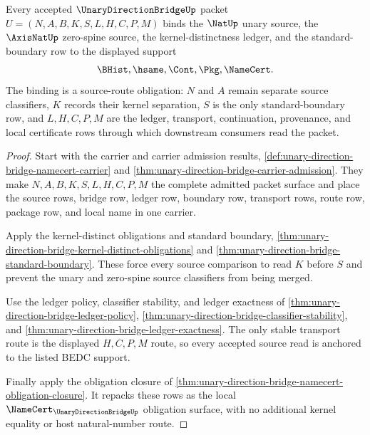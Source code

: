 \begin{theorem}
\label{thm:unary-direction-bridge-scope-source-anchors}
Every accepted $\UnaryDirectionBridgeUp$ packet $U=(N,A,B,K,S,L,H,C,P,M)$ binds the $\NatUp$ unary source, the $\AxisNatUp$ zero-spine source, the kernel-distinctness ledger, and the standard-boundary row to the displayed support
$$
\BHist,\hsame,\Cont,\Pkg,\NameCert.
$$
The binding is a source-route obligation: $N$ and $A$ remain separate source classifiers, $K$ records their kernel separation, $S$ is the only standard-boundary row, and $L,H,C,P,M$ are the ledger, transport, continuation, provenance, and local certificate rows through which downstream consumers read the packet.
\end{theorem}
\begin{proof}
Start with the carrier and carrier admission results, \autoref{def:unary-direction-bridge-namecert-carrier} and \autoref{thm:unary-direction-bridge-carrier-admission}. They make $N,A,B,K,S,L,H,C,P,M$ the complete admitted packet surface and place the source rows, bridge row, ledger row, boundary row, transport rows, route row, package row, and local name in one carrier.

Apply the kernel-distinct obligations and standard boundary, \autoref{thm:unary-direction-bridge-kernel-distinct-obligations} and \autoref{thm:unary-direction-bridge-standard-boundary}. These force every source comparison to read $K$ before $S$ and prevent the unary and zero-spine source classifiers from being merged.

Use the ledger policy, classifier stability, and ledger exactness of \autoref{thm:unary-direction-bridge-ledger-policy}, \autoref{thm:unary-direction-bridge-classifier-stability}, and \autoref{thm:unary-direction-bridge-ledger-exactness}. The only stable transport route is the displayed $H,C,P,M$ route, so every accepted source read is anchored to the listed BEDC support.

Finally apply the obligation closure of \autoref{thm:unary-direction-bridge-namecert-obligation-closure}. It repacks these rows as the local $\NameCert_{\UnaryDirectionBridgeUp}$ obligation surface, with no additional kernel equality or host natural-number route.
\end{proof}

